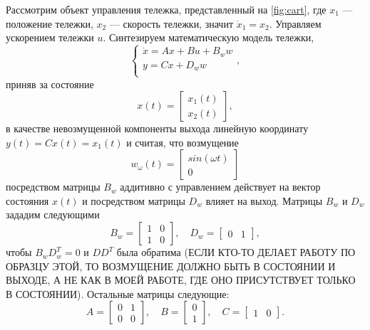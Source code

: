 Рассмотрим объект управления тележка, представленный на \autoref{fig:cart},
где $x_1$ --- положение тележки, $x_2$ --- скорость тележки, значит $\dot x_1=x_2$.
Управляем ускорением тележки $u$.
Синтезируем математическую модель тележки,
\begin{equation}
    \label{eq:sys}
    \begin{cases}
        \dot x=Ax+Bu+B_ww\\
        y=Cx+D_ww\\
    \end{cases},
\end{equation}
приняв за состояние
\begin{equation*}
    x(t)=\begin{bmatrix}
        x_1(t)\\
        x_2(t)
    \end{bmatrix},
\end{equation*}
в качестве невозмущенной компоненты выхода линейную координату
$y(t)=Cx(t)=x_1(t)$ и считая, что возмущение
\begin{equation*}
    w_\omega(t)=\begin{bmatrix}
        sin(\omega t)\\
        0
    \end{bmatrix}
\end{equation*}
посредством матрицы $B_w$
аддитивно с управлением действует на вектор состояния $x(t)$ и посредством матрицы $D_w$ 
влияет на выход. Матрицы $B_w$ и $D_w$ зададим следующими
\begin{equation*}
    B_w=\begin{bmatrix}
        1 & 0 \\
        1 & 0
    \end{bmatrix},\quad
    D_w=\begin{bmatrix}
        0 & 1
    \end{bmatrix},
\end{equation*}
чтобы $B_wD_w^T=0$ и $DD^T$ была обратима (ЕСЛИ КТО-ТО ДЕЛАЕТ РАБОТУ ПО ОБРАЗЦУ 
ЭТОЙ, ТО ВОЗМУЩЕНИЕ ДОЛЖНО БЫТЬ В СОСТОЯНИИ И ВЫХОДЕ, А НЕ КАК В МОЕЙ РАБОТЕ, 
ГДЕ ОНО ПРИСУТСТВУЕТ ТОЛЬКО В СОСТОЯНИИ). Остальные матрицы следующие:
\begin{equation*}
    A=\begin{bmatrix}
        0 & 1 \\
        0 & 0
    \end{bmatrix},\quad
    B=\begin{bmatrix}
        0 \\
        1
    \end{bmatrix},\quad
    C=\begin{bmatrix}
        1 & 0
    \end{bmatrix}.
\end{equation*}

